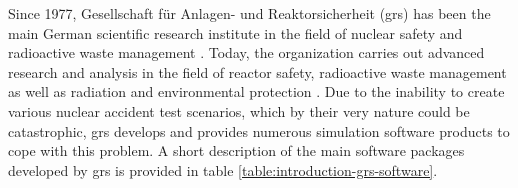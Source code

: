 Since 1977, Gesellschaft für Anlagen- und Reaktorsicherheit (\gls{grs}) has been the main German scientific research institute in the field of nuclear safety and radioactive waste management \cite{grs:grs-general-info}. Today, the organization carries out advanced research and analysis in the field of reactor safety, radioactive waste management as well as radiation and environmental protection \cite{grs:grs-general-info}. Due to the inability to create various nuclear accident test scenarios, which by their very nature could be catastrophic, \gls{grs} develops and provides numerous simulation software products to cope with this problem. A short description of the main software packages developed by \gls{grs} is provided in table \ref{table:introduction-grs-software}.\\



